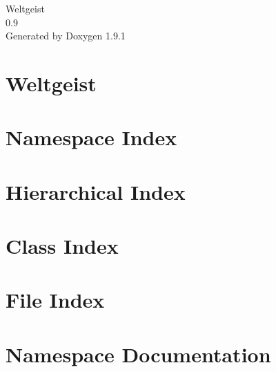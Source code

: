 \let\mypdfximage\pdfximage\def\pdfximage{\immediate\mypdfximage}\documentclass[twoside]{book}
\newcommand{\+}{\discretionary{\mbox{\scriptsize$\hookleftarrow$}}{}{}}
\newcommand{\clearemptydoublepage}{%
  \newpage{\pagestyle{empty}\cleardoublepage}%
}
\begin{document}
\raggedbottom

\hypersetup{pageanchor=false,
             bookmarksnumbered=true,
             pdfencoding=unicode
            }
\begin{titlepage}
\vspace*{7cm}
\begin{center}%
{\Large Weltgeist \\[1ex]\large 0.\+9 }\\
\vspace*{1cm}
{\large Generated by Doxygen 1.9.1}\\
\end{center}
\end{titlepage}
\clearemptydoublepage
{}
\tableofcontents
\clearemptydoublepage
{}
\hypersetup{pageanchor=true}

\chapter{Weltgeist}
\label{index}\hypertarget{index}{}
\chapter{Namespace Index}

\chapter{Hierarchical Index}

\chapter{Class Index}

\chapter{File Index}

\chapter{Namespace Documentation}





























\end{document}
